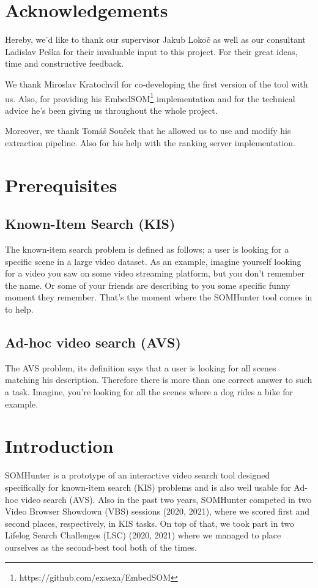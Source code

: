 

\chapter*{Acknowledgements}
Hereby, we'd like to thank our supervisor Jakub Lokoč as well as our consultant Ladislav Peška for their invaluable input to this project. For their great ideas, time and constructive feedback.

We thank Miroslav Kratochvíl for co-developing the first version of the tool with us. Also, for providing his EmbedSOM\footnote{https://github.com/exaexa/EmbedSOM} implementation and for the technical advice he's been giving us throughout the whole project.

Moreover, we thank Tomáš Souček that he allowed us to use and modify his extraction pipeline. Also for his help with the ranking server implementation.

\chapter{Prerequisites}
\section{Known-Item Search (KIS)}
The known-item search problem is defined as follows; a user is looking for a specific scene in a large video dataset. As an example, imagine yourself looking for a video you saw on some video streaming platform, but you don't remember the name. Or some of your friends are describing to you some specific funny moment they remember. That's the moment where the SOMHunter tool comes in to help. 

\section{Ad-hoc video search (AVS)}
The AVS problem, its definition says that a user is looking for all scenes matching his description. Therefore there is more than one correct answer to such a task. Imagine, you're looking for all the scenes where a dog rides a bike for example.

\chapter{Introduction}

SOMHunter is a prototype of an interactive video search tool designed specifically for known-item search (KIS) problems and is also well usable for Ad-hoc video search (AVS). Also in the past two years, SOMHunter competed in two Video Browser Showdown (VBS) sessions (2020, 2021), where we scored first and second places, respectively, in KIS tasks. On top of that, we took part in two Lifelog Search Challenges (LSC) (2020, 2021) where we managed to place ourselves as the second-best tool both of the times.

